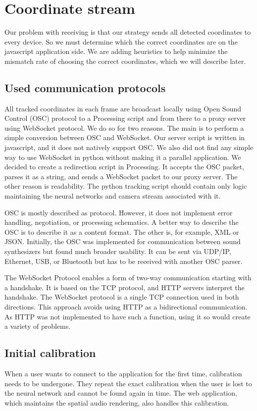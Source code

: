 \documentclass{ctuthesis}
\begin{document}
\section{Coordinate stream}
Our problem with receiving is that our strategy sends all detected coordinates to every device. So we must determine which the correct coordinates are on the javascript application side. We are adding heuristics to help minimize the mismatch rate of choosing the correct coordinates, which we will describe later.

\subsection{Used communication protocols}
All tracked coordinates in each frame are broadcast locally using Open Sound Control (OSC) protocol to a Processing\cite{94} script and from there to a proxy server using WebSocket protocol. We do so for two reasons. The main is to perform a simple conversion between OSC and WebSocket. Our server script is written in javascript, and it does not natively support OSC. We also did not find any simple way to use WebSocket in python without making it a parallel application. We decided to create a redirection script in Processing. It accepts the OSC packet, parses it as a string, and sends a WebSocket packet to our proxy server. The other reason is readability. The python tracking script should contain only logic maintaining the neural networks and camera stream associated with it.

OSC is mostly described as protocol. However, it does not implement error handling, negotiation, or processing schematics. A better way to describe the OSC is to describe it as a content format. The other is, for example, XML or JSON. Initially, the OSC was implemented for communication between sound synthesizers but found much broader usability. It can be sent via UDP/IP, Ethernet, USB, or Bluetooth but has to be received with another OSC parser\cite{93}.

The WebSocket Protocol enables a form of two-way communication starting with a handshake. It is based on the TCP protocol, and HTTP servers interpret the handshake. The WebSocket protocol is a single TCP connection used in both directions. This approach avoids using HTTP as a bidirectional communication. As HTTP was not implemented to have such a function, using it so would create a variety of problems\cite{92}. 

\subsection{Initial calibration} \label{calibration}
When a user wants to connect to the application for the first time, calibration needs to be undergone. They repeat the exact calibration when the user is lost to the neural network and cannot be found again in time. The web application, which maintains the spatial audio rendering, also handles this calibration.
\end{document}
